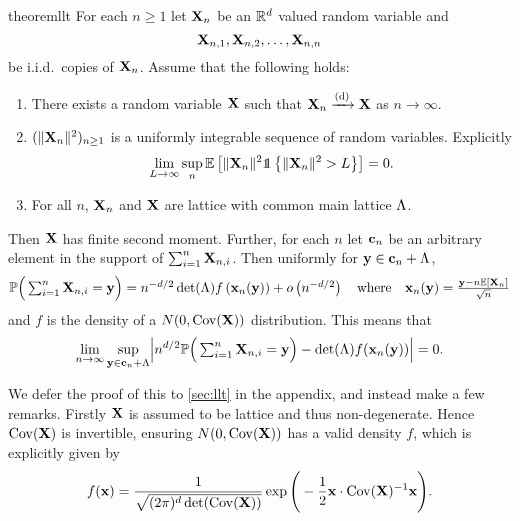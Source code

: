 \begin{restatable}{theorem}{llt}
    \label{thm:multi-triangular-llt}
    For each $n \geq 1$ let ${\mathbf X}_n$ be an ${\mathbb R}^d$ valued random variable and
    \begin{equation*}
        {\mathbf X}_{n, 1}, {\mathbf X}_{n, 2}, \ldots, {\mathbf X}_{n, n}  
    \end{equation*}
    be i.i.d.\ copies of ${\mathbf X}_n$. Assume that the following holds:
    \begin{enumerate}
        \item There exists a random variable ${\mathbf X}$ such that ${\mathbf X}_n \xrightarrow[]{\mathrm{(d)}} {\mathbf X}$ as $n \to \infty$.
        \item $(\lVert{\mathbf X}_n\rVert^2)_{n \geq 1}$ is a uniformly integrable sequence of random variables. Explicitly
            \begin{equation}
                \label{eq:ui-condition}
                \lim_{L \to \infty} \sup_n \E\left[
                    \norm{\vX_n}^2
                    \one \left\{ \norm{\vX_n}^2 > L \right\}
                \right] = 0.
            \end{equation}
        \item For all $n$, ${\mathbf X}_n$ and ${\mathbf X}$ are lattice with common main lattice $\Lambda$.
    \end{enumerate}
    Then ${\mathbf X}$ has finite second moment. Further, for each $n$ let ${\mathbf c}_n$ be an arbitrary element in the support of $\sum_{i=1}^n {\mathbf X}_{n, i}$. Then uniformly for ${\mathbf y} \in {\mathbf c}_n + \Lambda$,
    \begin{equation*}
        {\mathbb P}\Big(
            \textstyle \sum_{i=1}^n {\mathbf X}_{n, i} = {\mathbf y}
        \Big)
        = n^{-d/2} \det(\Lambda) f\left( {\mathbf x}_n({\mathbf y}) \right) + o \left( n^{-d/2} \right)
        \quad \text{where} \quad
        {\mathbf x}_n({\mathbf y}) = \frac{{\mathbf y} - n {\mathbb E}[{\mathbf X}_n]}{\sqrt{n}}
    \end{equation*}
    and $f$ is the density of a $N(0, \operatorname{Cov}({\mathbf X}))$ distribution. This means that
    \begin{equation*}
        \lim_{n \to \infty} \sup_{\vy \in \vc_n + \lattice} \abs*{
            n^{d/2} \P\Big( \textstyle \sum_{i=1}^n \vX_{n, i} = \vy \Big)
            - \det(\lattice) f(\vx_n(\vy))
        } = 0.
    \end{equation*}
\end{restatable}

We defer the proof of this to \cref{sec:llt} in the appendix, and instead make a few remarks. Firstly ${\mathbf X}$ is assumed to be lattice and thus non-degenerate. Hence $\operatorname{Cov}({\mathbf X})$ is invertible, ensuring $N(0, \operatorname{Cov}({\mathbf X}))$ has a valid density $f$, which is explicitly given by
\begin{equation*}
    f({\mathbf x}) = \frac{1}{\sqrt{(2 \pi)^d \det(\operatorname{Cov}({\mathbf X}))}}
    \exp \Bigg(
        -\frac{1}{2} {\mathbf x} \cdot \operatorname{Cov}({\mathbf X})^{-1} {\mathbf x}
        \Bigg).
\end{equation*}

